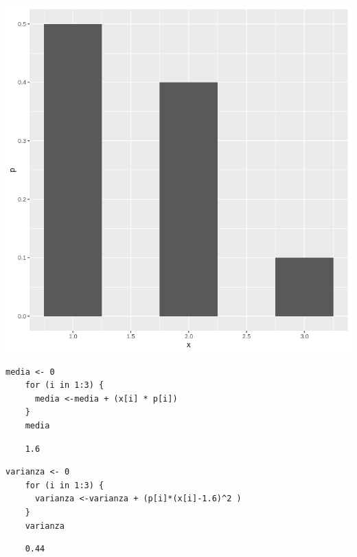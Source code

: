 \begin{enumerate}
    \includegraphics[scale=0.5]{img/tab2.png}
    
    \begin{lstlisting}[frame=single]
    media <- 0
    for (i in 1:3) {
      media <-media + (x[i] * p[i])
    }
    media
    \end{lstlisting}
    \begin{verbatim}
    1.6
    \end{verbatim}
    
    \begin{lstlisting}[frame=single]
    varianza <- 0
    for (i in 1:3) {
      varianza <-varianza + (p[i]*(x[i]-1.6)^2 )
    }
    varianza
    \end{lstlisting}
    \begin{verbatim}
    0.44
    \end{verbatim}
    

\end{enumerate}